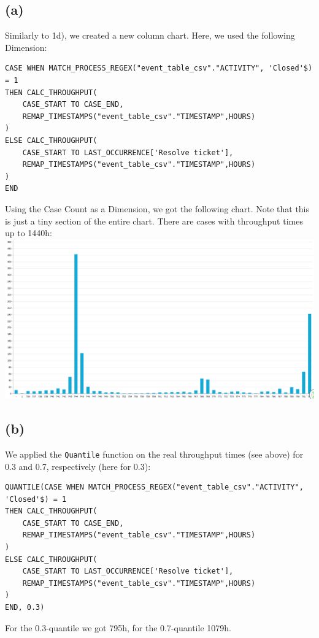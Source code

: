 \documentclass[../../main.tex]{subfiles}
\begin{document}
\subsection*{(a)}
Similarly to 1d), we created a new column chart. Here, we used the following Dimension:
\begin{verbatim}
CASE WHEN MATCH_PROCESS_REGEX("event_table_csv"."ACTIVITY", 'Closed'$) = 1
THEN CALC_THROUGHPUT(
	CASE_START TO CASE_END,
	REMAP_TIMESTAMPS("event_table_csv"."TIMESTAMP",HOURS)
)
ELSE CALC_THROUGHPUT(
	CASE_START TO LAST_OCCURRENCE['Resolve ticket'],
	REMAP_TIMESTAMPS("event_table_csv"."TIMESTAMP",HOURS)
)
END
\end{verbatim}
Using the Case Count as a Dimension, we got the following chart. Note that this is just a tiny section of the entire chart. There are cases with throughput times up to 1440h:\\
\includegraphics[width=\columnwidth]{img/Celonis_a_real_througput_times.png}


\subsection*{(b)}
We applied the \verb|Quantile| function on the real throughput times (see above) for 0.3 and 0.7, respectively (here for 0.3):
\begin{verbatim}
QUANTILE(CASE WHEN MATCH_PROCESS_REGEX("event_table_csv"."ACTIVITY", 'Closed'$) = 1
THEN CALC_THROUGHPUT(
	CASE_START TO CASE_END,
	REMAP_TIMESTAMPS("event_table_csv"."TIMESTAMP",HOURS)
)
ELSE CALC_THROUGHPUT(
	CASE_START TO LAST_OCCURRENCE['Resolve ticket'],
	REMAP_TIMESTAMPS("event_table_csv"."TIMESTAMP",HOURS)
)
END, 0.3)
\end{verbatim}
For the 0.3-quantile we got 795h, for the 0.7-quantile 1079h.
\end{document}
